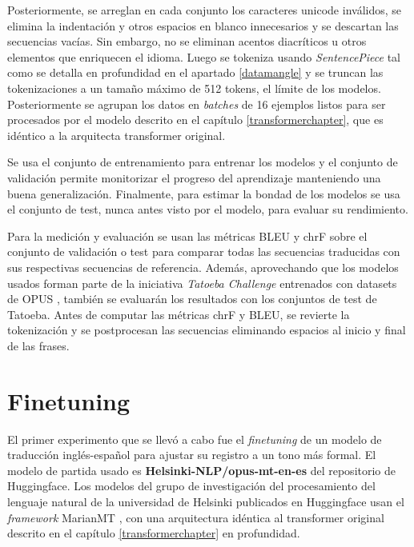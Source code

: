 Posteriormente, se arreglan en cada conjunto los caracteres unicode inválidos, se elimina la indentación y otros espacios en blanco innecesarios y se descartan las secuencias vacías. Sin embargo, no se eliminan acentos diacríticos u otros elementos que enriquecen el idioma. Luego se tokeniza usando \textit{SentencePiece} tal como se detalla en profundidad en el apartado \ref{datamangle} y se truncan las tokenizaciones a un tamaño máximo de 512 tokens, el límite de los modelos. Posteriormente se agrupan los datos en \textit{batches} de 16 ejemplos listos para ser procesados por el modelo descrito en el capítulo \ref{transformerchapter}, que es idéntico a la arquitecta transformer original.

Se usa el conjunto de entrenamiento para entrenar los modelos y el conjunto de validación permite monitorizar el progreso del aprendizaje manteniendo una buena generalización. Finalmente, para estimar la bondad de los modelos se usa el conjunto de test, nunca antes visto por el modelo, para evaluar su rendimiento.

Para la medición y evaluación se usan las métricas BLEU y chrF sobre el conjunto de validación o test para comparar todas las secuencias traducidas con sus respectivas secuencias de referencia.
Además, aprovechando que los modelos usados forman parte de la iniciativa \textit{Tatoeba Challenge} \cite{tiedemann-2020-tatoeba} entrenados con datasets de OPUS \cite{CORPUS}, también se evaluarán los resultados con los conjuntos de test de Tatoeba.
Antes de computar las métricas chrF y BLEU, se revierte la tokenización y se postprocesan las secuencias eliminando espacios al inicio y final de las frases.


\section{Finetuning}\label{finetune}
El primer experimento que se llevó a cabo fue el \textit{finetuning} de un modelo de traducción inglés-español para ajustar su registro a un tono más formal.
El modelo de partida usado es \textbf{Helsinki-NLP/opus-mt-en-es} del repositorio de Huggingface.
Los modelos del grupo de investigación del procesamiento del lenguaje natural de la universidad de Helsinki publicados en Huggingface usan el \textit{framework} MarianMT \cite{Junczys-Dowmunt2018Apr}, con una arquitectura idéntica al transformer original descrito en el capítulo \ref{transformerchapter} en profundidad.

